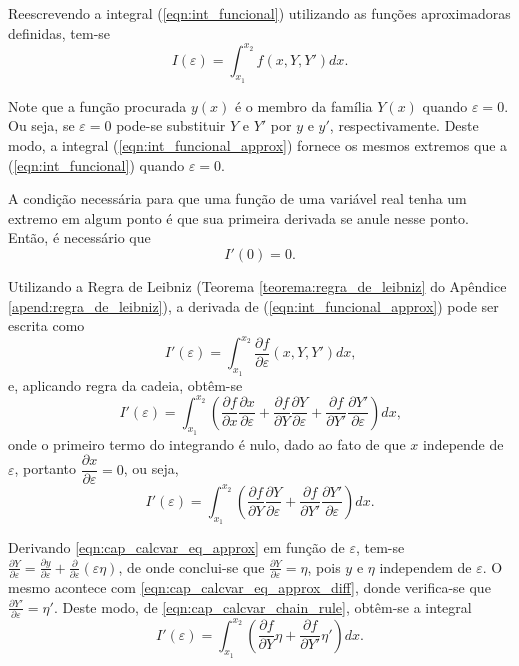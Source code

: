 \documentclass[
	12pt,				%
	openright,			%
    twoside,			%
	a4paper,			%
	english,			%
	french,				%
	spanish,			%
	brazil				%
	]{abntex2}
\numberwithin{lema}{chapter}
\numberwithin{teorema}{chapter}
\numberwithin{definicao}{chapter}
\numberwithin{figure}{chapter}
\begin{document}
Reescrevendo a integral (\ref{eqn:int_funcional}) utilizando as funções aproximadoras definidas, tem-se
\begin{equation}\label{eqn:int_funcional_approx}
I(\varepsilon)=\int_{x_1}^{x_2}f(x, Y, Y')dx\text{.}
\end{equation}

Note que a função procurada $y(x)$ é o membro da família $Y(x)$ quando $\varepsilon = 0$. Ou seja, se $\varepsilon = 0$ pode-se substituir $Y$ e $Y'$ por $y$ e $y'$, respectivamente. Deste modo, a integral (\ref{eqn:int_funcional_approx}) fornece os mesmos extremos que a (\ref{eqn:int_funcional}) quando $\varepsilon=0$.

A condição necessária para que uma função de uma variável real tenha um extremo em algum ponto é que sua primeira derivada se anule nesse ponto. Então, é necessário que
\begin{equation}\label{eqn:cap_calcvar_condition}
I'(0)=0\text{.}
\end{equation}

Utilizando a Regra de Leibniz (Teorema \ref{teorema:regra_de_leibniz} do Apêndice \ref{apend:regra_de_leibniz}), a derivada de (\ref{eqn:int_funcional_approx}) pode ser escrita como
$$I'(\varepsilon)=\int_{x_1}^{x_2} \frac{\partial f}{\partial \varepsilon} (x, Y, Y') dx \text{,}$$
e, aplicando regra da cadeia, obtêm-se
$$I'(\varepsilon)=\int_{x_1}^{x_2}\left ( \frac{\partial f}{\partial x}\frac{\partial x}{\partial \varepsilon} + \frac{\partial f}{\partial Y} \frac{\partial Y}{\partial \varepsilon} + \frac{\partial f}{\partial Y'} \frac{\partial Y'}{\partial \varepsilon} \right )dx\text{,}$$
onde o primeiro termo do integrando é nulo, dado ao fato de que $x$ independe de $\varepsilon$, portanto $\dfrac{\partial x}{\partial \varepsilon}=0$, ou seja,
\begin{equation}\label{eqn:cap_calcvar_chain_rule}
I'(\varepsilon)=\int_{x_1}^{x_2}\left ( \frac{\partial f}{\partial Y}\frac{\partial Y}{\partial \varepsilon} + \frac{\partial f}{\partial Y'}\frac{\partial Y'}{\partial \varepsilon} \right ) dx \text{.}
\end{equation}

Derivando \eqref{eqn:cap_calcvar_eq_approx} em função de $\varepsilon$, tem-se $\frac{\partial Y}{\partial \varepsilon}=\frac{\partial y}{\partial \varepsilon}+\frac{\partial}{\partial \varepsilon}(\varepsilon \eta)$, de onde conclui-se que $\frac{\partial Y}{\partial \varepsilon}=\eta$, pois $y$ e $\eta$ independem de $\varepsilon$. O mesmo acontece com \eqref{eqn:cap_calcvar_eq_approx_diff}, donde verifica-se que $\frac{\partial Y'}{\partial \varepsilon}=\eta'$. Deste modo, de \eqref{eqn:cap_calcvar_chain_rule}, obtêm-se a integral
$$I'(\varepsilon)=\int_{x_1}^{x_2}\left ( 
	\frac{\partial f}{\partial Y} \eta +
	\frac{\partial f}{\partial Y'} \eta '
\right )dx \text{.}
$$
\end{document}
